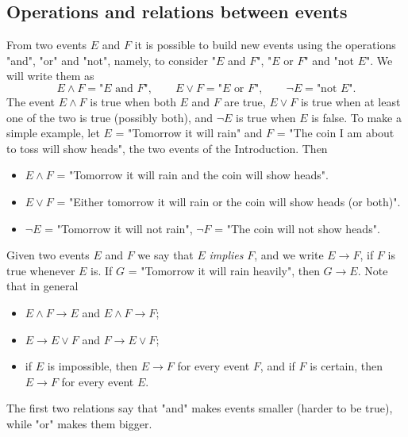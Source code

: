 \subsection{Operations and relations between events}
\label{ss:operations}
From two events $E$ and $F$ it is possible to build new events using the operations "and", "or" and "not", namely, to consider "$E$ and $F$", "$E$ or $F$" and "not $E$". We will write them as 
\begin{equation}
	\label{e:and_or_not}
	E \wedge F = \text{"$E$ and $F$"}, \qquad E \vee F = \text{"$E$ or $F$"}, \qquad \neg E = \text{"not $E$"}.
\end{equation}
The event $E \wedge F$ is true when both $E$ and $F$ are true, $E \vee F$ is true when at least one of the two is true (possibly both), and $\neg E$ is true when $E$ is false. To make a simple example, let $E$ = "Tomorrow it will rain" and $F$ = "The coin I am about to toss will show heads", the two events of the Introduction. Then 
\begin{itemize}
	\item $E \wedge F$ = "Tomorrow it will rain and the coin will show heads".
	\item $E \vee F$ = "Either tomorrow it will rain or the coin will show heads (or both)".
	\item $\neg E$ = "Tomorrow it will not rain", $\neg F$ = "The coin will not show heads".
\end{itemize}

Given two events $E$ and $F$ we say that $E$ \emph{implies} $F$, and we write $E \rightarrow F$, if $F$ is true whenever $E$ is. If $G$ = "Tomorrow it will rain heavily", then $G \rightarrow E$. Note that in general 
\begin{itemize}
	\item $E \wedge F \rightarrow E$ and $E \wedge F \rightarrow F$;
	\item $E \rightarrow E \vee F$ and $F \rightarrow E \vee F$;
	\item if $E$ is impossible, then $E \rightarrow F$ for every event $F$, and if $F$ is certain, then $E \rightarrow F$ for every event $E$.
\end{itemize}
The first two relations say that "and" makes events smaller (harder to be true), while "or" makes them bigger. 




